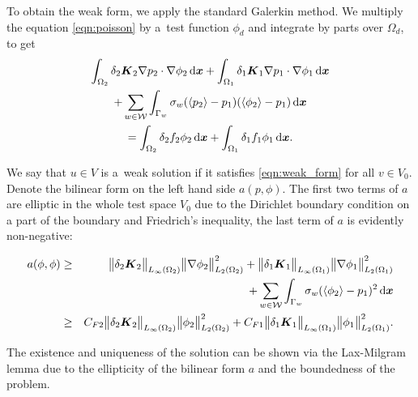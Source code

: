 To obtain the weak form, we apply the standard Galerkin method. We multiply the equation \eqref{eqn:poisson} 
by a~test function $\phi_d$ and integrate by parts over $\Omega_d$, to get
\begin{multline} \label{eqn:weak_form1}
  \int_{\Omega_2} \delta_2 \mathbf{\boldsymbol{K}}_2 \nabla p_2 \cdot \nabla \phi_2 \,{\rm d}\mathbf{\boldsymbol{x}}
  + \int_{\Omega_1} \delta_1 \mathbf{\boldsymbol{K}}_1 \nabla p_1 \cdot \nabla \phi_1 \,{\rm d}\mathbf{\boldsymbol{x}} \\
  + \sum_{w\in \mathcal{W}} \int_{\Gamma_w} \sigma_w (\langle p_2\rangle - p_1) (\langle\phi_2\rangle - p_1) \,{\rm d}\mathbf{\boldsymbol{x}} \\
  = \int_{\Omega_2} \delta_2 f_2 \phi_2 \,{\rm d}\mathbf{\boldsymbol{x}} + \int_{\Omega_1} \delta_1 f_1 \phi_1 \,{\rm d}\mathbf{\boldsymbol{x}}.
\end{multline}

We say that $u\in V$ is a~weak solution if it satisfies \eqref{eqn:weak_form} for all $v\in V_0$.
Denote the bilinear form on the left hand side $a(p,\phi)$.
The first two terms of $a$ are elliptic in the whole test space $V_0$
due to the Dirichlet boundary condition on a part of the boundary and Friedrich's inequality,
the last term of $a$ is evidently non-negative:

\begin{eqnarray}
    a(\phi,\phi) &\geq&
          \bigl\Vert\delta_2 \mathbf{\boldsymbol{K}}_2\bigr\Vert_{L_\infty(\Omega_2)}\bigl\Vert\nabla\phi_2\bigr\Vert^2_{L_2(\Omega_2)}
        + \bigl\Vert\delta_1 \mathbf{\boldsymbol{K}}_1\bigr\Vert_{L_\infty(\Omega_1)}\bigl\Vert\nabla\phi_1\bigr\Vert^2_{L_2(\Omega_1)}\\
        &&+ \sum_{w\in \mathcal{W}} \int_{\Gamma_w} \sigma_w (\langle\phi_2\rangle - p_1)^2 \,{\rm d}\mathbf{\boldsymbol{x}} \\
        &\geq&
          C_{F2} \bigl\Vert\delta_2 \mathbf{\boldsymbol{K}}_2\bigr\Vert_{L_\infty(\Omega_2)}\bigl\Vert\phi_2\bigr\Vert^2_{L_2(\Omega_2)}
        + C_{F1} \bigl\Vert\delta_1 \mathbf{\boldsymbol{K}}_1\bigr\Vert_{L_\infty(\Omega_1)}\bigl\Vert\phi_1\bigr\Vert^2_{L_2(\Omega_1)}.
\end{eqnarray}

The existence and uniqueness of the solution can be shown 
via the Lax-Milgram lemma due to the ellipticity of the bilinear form $a$ and the boundedness of the problem.









